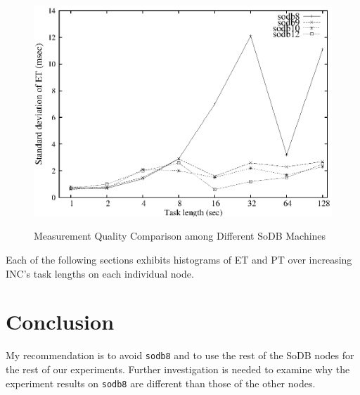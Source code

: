 \documentclass[10pt]{article}
\begin{document}
\begin{figure}[h]
{		\includegraphics[scale=0.6]{overall/machine_pt_std.eps}
        \label{fig:pt_std}
    }
    \caption{Measurement Quality Comparison among Different SoDB Machines}
    \label{fig:machine_comp}
\end{figure}


Each of the following sections exhibits histograms of ET and PT 
over increasing INC's task lengths on each individual node. 







\newpage

\section{Conclusion}
My recommendation is to avoid {\tt sodb8} and to use the rest of 
the SoDB nodes for the rest of our experiments. Further investigation is 
needed to examine why the experiment results on {\tt sodb8} are different 
than those of the other nodes. 
\end{document}
